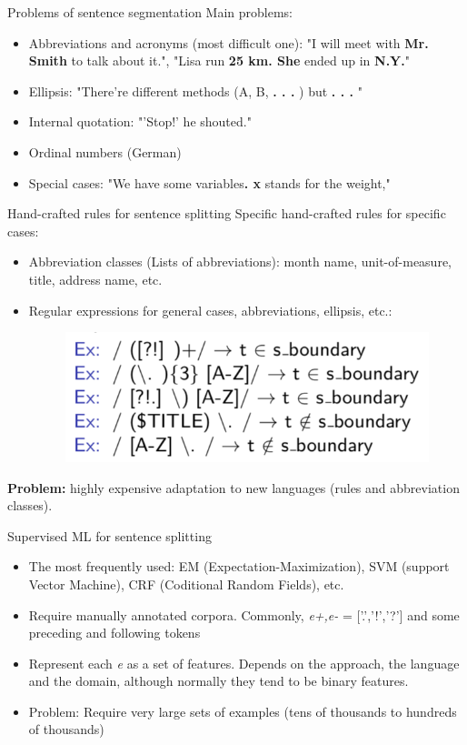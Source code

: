 \begin{frame}[containsverbatim]{Problems of sentence segmentation}
    Main problems:
    \begin{itemize}
        \item Abbreviations and acronyms (most difficult one): "I will meet with \textbf{Mr. Smith} to talk about it.", "Lisa run \textbf{25 km. She} ended up in \textbf{N.Y.}"
        \item Ellipsis: "There’re different methods (A, B, \textbf{. . .} ) but \textbf{. . .} "
        \item Internal quotation: "'Stop!' he shouted."
        \item Ordinal numbers (German)
        \item Special cases: "We have some variables\textbf{. x} stands for the weight,"
    \end{itemize}
\end{frame}

\begin{frame}[containsverbatim]{Hand-crafted rules for sentence splitting}
    Specific hand-crafted rules for specific cases:
    \begin{itemize}
        \item Abbreviation classes (Lists of abbreviations): month name, unit-of-measure, title, address name, etc.
        \item Regular expressions for general cases, abbreviations, ellipsis, etc.:
        \begin{figure}
            \centering
            \includegraphics[width=0.6\linewidth]{img/example1.png}
        \end{figure}
    \end{itemize}
    
   \textbf{ Problem:} highly expensive adaptation to new languages (rules and abbreviation classes).
\end{frame}

\begin{frame}[containsverbatim]{Supervised ML for sentence splitting}
    \begin{itemize}
        \item The most frequently used: EM (Expectation-Maximization), SVM (support Vector Machine), CRF (Coditional Random Fields), etc.
        \item Require manually annotated corpora. Commonly,\textit{ e+,e-} = [’.’,’!’,’?’] and some preceding and following tokens
        \item Represent each \textit{e} as a set of features. Depends on the approach, the language and the domain, although normally they tend to be binary features.
        \item Problem: Require very large sets of examples (tens of thousands to hundreds of thousands)
    \end{itemize}
\end{frame}

